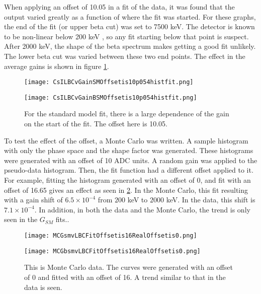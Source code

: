 \documentclass[../MaxHughesThesis.tex]{subfiles}
\begin{document}
When applying an offset of 10.05 in a fit of the data, it was found that the output varied greatly as a function of where the fit was started.
For these graphs, the end of the fit (or upper beta cut) was set to 7500 keV.
The detector is known to be non-linear below 200 keV \cite{Kno10}, so any fit starting below that point is suspect. 
After 2000 keV, the shape of the beta spectrum makes getting a good fit unlikely.
The lower beta cut was varied between these two end points.
The effect in the average gains is shown in figure \ref{fig:offset10LBCeffect}.

\begin{figure}
    \centering
    \begin{minipage}{0.50\textwidth}
        \centerline{\texttt{[image: CsILBCvGainSMOffsetis10p054histfit.png]}}
    \end{minipage}\hfill
    \begin{minipage}{0.50\textwidth}
        \centerline{\texttt{[image: CsILBCvGainBSMOffsetis10p054histfit.png]}}
    \end{minipage}
    \caption{For the standard model fit, there is a large dependence of the gain on the start of the fit.
	     The offset here is 10.05.}
    \label{fig:offset10LBCeffect}
\end{figure}

To test the effect of the offset, a Monte Carlo was written.
A sample histogram with only the phase space and the shape factor was generated. 
These histograms were generated with an offset of 10 ADC units.
A random gain was applied to the pseudo-data histogram. 
Then, the fit function had a different offset applied to it.
For example, fitting the histogram generated with an offset of 0, and fit with an offset of 16.65 gives an effect as seen in \ref{fig:MCoffset10applied20}.
In the Monte Carlo, this fit resulting with a gain shift of $6.5 \times 10^{-4}$ from $200$ keV to $2000$ keV.
In the data, this shift is $7.1 \times 10^{-4}$. 
In addition, in both the data and the Monte Carlo, the trend is only seen in the $G_{SM}$ fits..

\begin{figure}
	\centering
	\begin{minipage}{0.50\textwidth}
		\centerline{\texttt{[image: MCGsmvLBCFitOffsetis16RealOffsetis0.png]}}
	\end{minipage}\hfill
	\begin{minipage}{0.50\textwidth}
		\centerline{\texttt{[image: MCGbsmvLBCFitOffsetis16RealOffsetis0.png]}}
	\end{minipage}
	\caption{This is Monte Carlo data.
		 The curves were generated with an offset of 0 and fitted with an offset of 16.
		 A trend similar to that in the data is seen.}
	\label{fig:MCoffset10applied20}
\end{figure}
\end{document}
